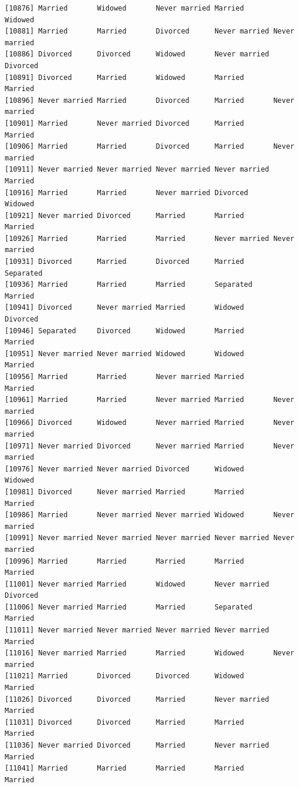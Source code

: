 \documentclass[
  letterpaper,
  DIV=11,
  numbers=noendperiod,
  oneside]{scrartcl}
\begin{document}
\begin{verbatim}
[10876] Married       Widowed       Never married Married       Widowed      
[10881] Married       Married       Divorced      Never married Never married
[10886] Divorced      Divorced      Widowed       Never married Divorced     
[10891] Divorced      Married       Widowed       Married       Married      
[10896] Never married Married       Divorced      Married       Never married
[10901] Married       Never married Divorced      Married       Married      
[10906] Married       Married       Divorced      Married       Never married
[10911] Never married Never married Never married Never married Married      
[10916] Married       Married       Never married Divorced      Widowed      
[10921] Never married Divorced      Married       Married       Married      
[10926] Married       Married       Married       Never married Never married
[10931] Divorced      Married       Divorced      Married       Separated    
[10936] Married       Married       Married       Separated     Married      
[10941] Divorced      Never married Married       Widowed       Divorced     
[10946] Separated     Divorced      Widowed       Married       Married      
[10951] Never married Never married Widowed       Widowed       Married      
[10956] Married       Married       Never married Married       Married      
[10961] Married       Married       Never married Married       Never married
[10966] Divorced      Widowed       Never married Married       Never married
[10971] Never married Divorced      Never married Married       Never married
[10976] Never married Never married Divorced      Widowed       Widowed      
[10981] Divorced      Never married Married       Married       Married      
[10986] Married       Never married Never married Widowed       Never married
[10991] Never married Never married Never married Never married Never married
[10996] Married       Married       Married       Married       Married      
[11001] Never married Married       Widowed       Never married Divorced     
[11006] Never married Married       Married       Separated     Married      
[11011] Never married Never married Never married Never married Married      
[11016] Never married Married       Married       Widowed       Never married
[11021] Married       Divorced      Divorced      Widowed       Married      
[11026] Divorced      Divorced      Married       Never married Married      
[11031] Divorced      Divorced      Married       Married       Married      
[11036] Never married Divorced      Married       Never married Married      
[11041] Married       Married       Married       Married       Married      

\end{verbatim}
\end{document}
